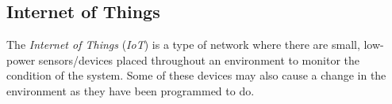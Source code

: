\subsection{Internet of Things}\label{subsec:IoT}
\begin{definition}\label{def:IoT}
  The \emph{Internet of Things} (\emph{IoT}) is a type of network where there are small, low-power sensors/devices placed throughout an environment to monitor the condition of the system.
  Some of these devices may also cause a change in the environment as they have been programmed to do.
\end{definition}

